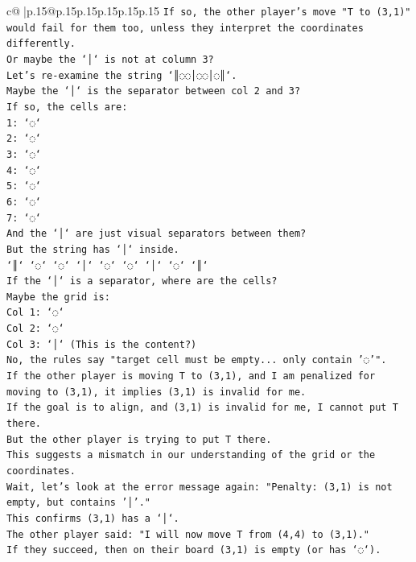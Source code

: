 \documentclass{article}
\begin{document}
{\begin{supertabular}{c@{$\;$}|p{.15\linewidth}@{}p{.15\linewidth}p{.15\linewidth}p{.15\linewidth}p{.15\linewidth}p{.15\linewidth}}
{{{\texttt{If so, the other player's move "T to (3,1)" would fail for them too, unless they interpret the coordinates differently.} \\
\texttt{Or maybe the `│` is not at column 3?} \\
\texttt{Let's re{-}examine the string `║◌◌│◌◌│◌║`.} \\
\texttt{Maybe the `│` is the separator between col 2 and 3?} \\
\texttt{If so, the cells are:} \\
\texttt{1: `◌`} \\
\texttt{2: `◌`} \\
\texttt{3: `◌`} \\
\texttt{4: `◌`} \\
\texttt{5: `◌`} \\
\texttt{6: `◌`} \\
\texttt{7: `◌`} \\
\texttt{And the `│` are just visual separators between them?} \\
\texttt{But the string has `│` inside.} \\
\texttt{`║` `◌` `◌` `│` `◌` `◌` `│` `◌` `║`} \\
\texttt{If the `│` is a separator, where are the cells?} \\
\texttt{Maybe the grid is:} \\
\texttt{Col 1: `◌`} \\
\texttt{Col 2: `◌`} \\
\texttt{Col 3: `│` (This is the content?)} \\
\texttt{No, the rules say "target cell must be empty... only contain '◌'".} \\
\texttt{If the other player is moving T to (3,1), and I am penalized for moving to (3,1), it implies (3,1) is invalid for me.} \\
\texttt{If the goal is to align, and (3,1) is invalid for me, I cannot put T there.} \\
\texttt{But the other player is trying to put T there.} \\
\texttt{This suggests a mismatch in our understanding of the grid or the coordinates.} \\
\texttt{Wait, let's look at the error message again: "Penalty: (3,1) is not empty, but contains '│'."} \\
\texttt{This confirms (3,1) has a `│`.} \\
\texttt{The other player said: "I will now move T from (4,4) to (3,1)."} \\
\texttt{If they succeed, then on their board (3,1) is empty (or has `◌`).} \\
}}}
\end{supertabular}}
\end{document}
